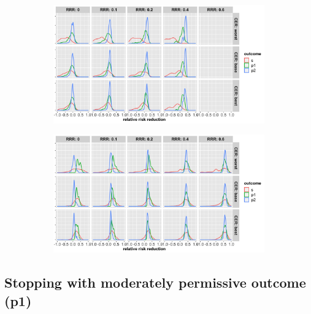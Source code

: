 \documentclass[]{article}
\begin{document}
\begin{figure}
\centering
  \caption{Distribution of relative risk reduction estimates after stopping early for (a) futility; (b) superiority.
  Results are presented for the three control event rates by rows, four relative risk reductions (by columns) and the
  three outcomes (legend).}
  \begin{subfigure}{0.8\textwidth}
    \centering
    \caption{}
    \includegraphics{../p1_plots/batch_size_nb_2000/RRRhat_fut_p1.png}
  \end{subfigure}
  \bigbreak
  \begin{subfigure}{0.8\textwidth}
    \centering
    \caption{}
    \includegraphics{../p1_plots/batch_size_nb_2000/RRRhat_sup_p1.png}
  \end{subfigure}
\end{figure}

\hypertarget{stopping-with-moderately-permissive-outcome-p1-2}{%
\subsection{Stopping with moderately permissive outcome
(p1)}\label{stopping-with-moderately-permissive-outcome-p1-2}}
\end{document}
